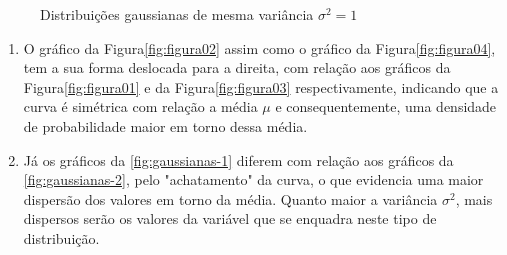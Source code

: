 \begin{prob}
\begin{sol}
\begin{figure}[!htb]
    \end{figure}
    \begin{figure}[!htb]
      \centering
      \hfill
      \caption{Distribuições gaussianas de mesma variância $\sigma^2=1$}
      \label{fig:gaussianas-2}       
    \end{figure}
    \begin{enumerate}[label=\alph *)]
      \item O gráfico da Figura\autoref{fig:figura02} assim como o gráfico da Figura\autoref{fig:figura04}, tem a sua forma deslocada para a direita, com relação aos gráficos da Figura\autoref{fig:figura01} e da Figura\autoref{fig:figura03} respectivamente, indicando que a curva é simétrica com relação a média $\mu$ e consequentemente, uma densidade de probabilidade maior em torno dessa média.
      \item Já os gráficos da \autoref{fig:gaussianas-1} diferem com relação aos gráficos da \autoref{fig:gaussianas-2}, pelo "achatamento" da curva, o que evidencia uma maior dispersão dos valores em torno da média. Quanto maior a variância $\sigma^2$, mais dispersos serão os valores da variável que se enquadra neste tipo de distribuição. 
    \end{enumerate}
  \end{sol}
\end{prob}